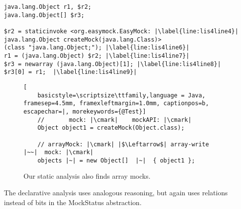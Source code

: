 \begin{lstlisting}[basicstyle=\ttfamily, caption={Jimple Intermediate Representation for the array in Figure~\ref{fig:arrayMockIllustration}.},
basicstyle=\scriptsize\ttfamily, framesep=4.5mm, framexleftmargin=1.0mm, captionpos=b, label=lis:arrayIllustrationIR, escapechar=|, morekeywords={@Test, specialinvoke, virtualinvoke, staticinvoke, newarray}]
java.lang.Object r1, $r2;
java.lang.Object[] $r3;

$r2 = staticinvoke <org.easymock.EasyMock: |\label{line:lis4line4}|
java.lang.Object createMock(java.lang.Class)>
(class "java.lang.Object;"); |\label{line:lis4line6}|
r1 = (java.lang.Object) $r2; |\label{line:lis4line7}|
$r3 = newarray (java.lang.Object)[1]; |\label{line:lis4line8}|
$r3[0] = r1;  |\label{line:lis4line9}|
\end{lstlisting}

\begin{figure}[h]
	\begin{lstlisting}[
	basicstyle=\scriptsize\ttfamily,language = Java, framesep=4.5mm, framexleftmargin=1.0mm, captionpos=b, escapechar=|, morekeywords={@Test}]
	//       mock: |\cmark|    mockAPI: |\cmark|
	Object object1 = createMock(Object.class);
	
	// arrayMock: |\cmark| |$\Leftarrow$| array-write    |~~|  mock: |\cmark|
	objects |~| = new Object[]  |~|  { object1 };
	\end{lstlisting}
	
	\caption{Our static analysis also finds array mocks.}
	\label{fig:arrayMockIllustration}
	
\end{figure}

The declarative analysis uses analogous reasoning, but again uses relations instead of bits in the MockStatus abstraction.
